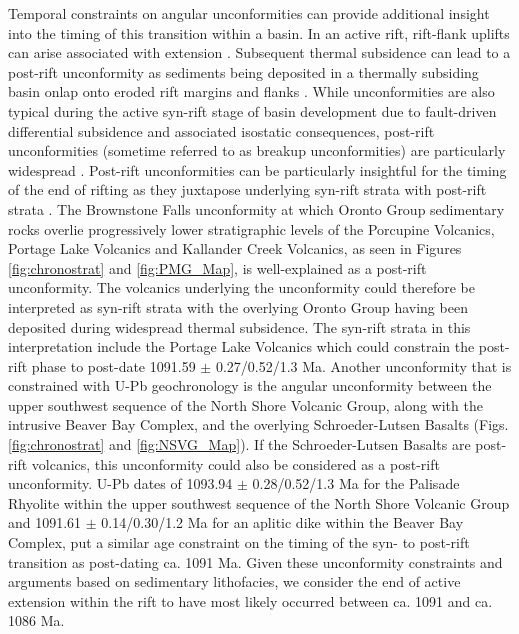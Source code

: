 \documentclass[11pt,letterpaper]{article}
\begin{document}
Temporal constraints on angular unconformities can provide additional insight into the timing of this transition within a basin. In an active rift, rift-flank uplifts can arise associated with extension \citep{Braun1989a}. Subsequent thermal subsidence can lead to a post-rift unconformity as sediments being deposited in a thermally subsiding basin onlap onto eroded rift margins and flanks \citep{Braun1989a, Embry1990a, Bosence1998a}. While unconformities are also typical during the active syn-rift stage of basin development due to fault-driven differential subsidence and associated isostatic consequences, post-rift unconformities (sometime referred to as breakup unconformities) are particularly widespread \citep{Bosence1998a}. Post-rift unconformities can be particularly insightful for the timing of the end of rifting as they juxtapose underlying syn-rift strata with post-rift strata \citep{Embry1990a,Franke2013a}. The Brownstone Falls unconformity at which Oronto Group sedimentary rocks overlie progressively lower stratigraphic levels of the Porcupine Volcanics, Portage Lake Volcanics and Kallander Creek Volcanics, as seen in Figures \ref{fig:chronostrat} and \ref{fig:PMG_Map}, is well-explained as a post-rift unconformity. The volcanics underlying the unconformity could therefore be interpreted as syn-rift strata with the overlying Oronto Group having been deposited during widespread thermal subsidence. The syn-rift strata in this interpretation include the Portage Lake Volcanics which could constrain the post-rift phase to post-date 1091.59 $\pm$ 0.27/0.52/1.3 Ma. Another unconformity that is constrained with U-Pb geochronology is the angular unconformity between the upper southwest sequence of the North Shore Volcanic Group, along with the intrusive Beaver Bay Complex, and the overlying Schroeder-Lutsen Basalts (Figs. \ref{fig:chronostrat} and \ref{fig:NSVG_Map}). If the Schroeder-Lutsen Basalts are post-rift volcanics, this unconformity could also be considered as a post-rift unconformity. U-Pb dates of 1093.94 $\pm$ 0.28/0.52/1.3 Ma for the Palisade Rhyolite within the upper southwest sequence of the North Shore Volcanic Group and 1091.61 $\pm$ 0.14/0.30/1.2 Ma for an aplitic dike within the Beaver Bay Complex, put a similar age constraint on the timing of the syn- to post-rift transition as post-dating ca. 1091 Ma. Given these unconformity constraints and arguments based on sedimentary lithofacies, we consider the end of active extension within the rift to have most likely occurred between ca. 1091 and ca. 1086 Ma.
\end{document}
